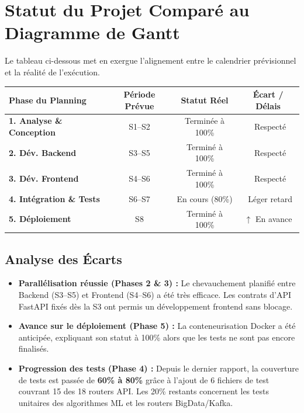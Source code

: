 \documentclass[12pt,a4paper]{article}
\newcommand{\cmark}{\textcolor{vert}{\ding{51}}}
\newcommand{\wmark}{\textcolor{orange}{\ding{115}}}
\begin{document}
\section{Statut du Projet Comparé au Diagramme de Gantt}

Le tableau ci-dessous met en exergue l'alignement entre le calendrier prévisionnel et la réalité de l'exécution.

\begin{center}
\renewcommand{\arraystretch}{1.4}
\begin{tabular}{|>{\bfseries}l|c|c|c|}
\hline
\rowcolor{bleu!15}
\textbf{Phase du Planning} & \textbf{Période Prévue} & \textbf{Statut Réel} & \textbf{Écart / Délais} \\
\hline
1. Analyse \& Conception & S1--S2 & Terminée à 100\% & \cmark~Respecté \\
\hline
2. Dév. Backend & S3--S5 & Terminé à 100\% & \cmark~Respecté \\
\hline
3. Dév. Frontend & S4--S6 & Terminé à 100\% & \cmark~Respecté \\
\hline
4. Intégration \& Tests & S6--S7 & En cours (80\%) & \wmark~Léger retard \\
\hline
5. Déploiement & S8 & Terminé à 100\% & \textbf{\textcolor{vert}{$\uparrow$}} En avance \\
\hline
\end{tabular}
\end{center}

\subsection{Analyse des Écarts}
\begin{itemize}[leftmargin=*]
    \item \textbf{Parallélisation réussie (Phases 2 \& 3) :} Le chevauchement planifié entre Backend (S3--S5) et Frontend (S4--S6) a été très efficace. Les contrats d'API FastAPI fixés dès la S3 ont permis un développement frontend sans blocage.
    
    \item \textbf{Avance sur le déploiement (Phase 5) :} La conteneurisation Docker a été anticipée, expliquant son statut à 100\% alors que les tests ne sont pas encore finalisés.
    
    \item \textbf{Progression des tests (Phase 4) :} Depuis le dernier rapport, la couverture de tests est passée de \textbf{60\% à 80\%} grâce à l'ajout de 6 fichiers de test couvrant 15 des 18 routers API. Les 20\% restants concernent les tests unitaires des algorithmes ML et les routers BigData/Kafka.
\end{itemize}
\end{document}
